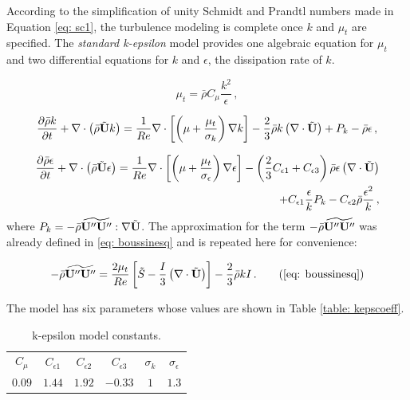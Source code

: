 According to the simplification of unity Schmidt and Prandtl numbers made in Equation \eqref{eq: sc1}, the turbulence modeling
is complete once $k$ and $\mu_t$ are specified. The \textit{standard k-epsilon}
model provides one algebraic equation for $\mu_t$ and two differential equations
for $k$ and $\epsilon$, the dissipation rate of $k$. 

\begin{equation}
 \mu_t = \bar{\rho} C_{\mu} \frac{k^2}{\epsilon} \, ,
\end{equation}

\begin{equation}
 \frac{\partial \bar{\rho}k}{\partial t} + \nabla \cdot \left( \bar{\rho}
\tilde{\mathbf{U}} k \right) = \frac{1}{Re}\nabla \cdot \left[ \left( \mu +
\frac{\mu_t}{\sigma_k} \right) \nabla k \right] -\frac{2}{3} \bar{\rho} k \left(
\nabla \cdot \tilde{\mathbf{U}} \right) + P_k -\bar{\rho} \epsilon \, ,
\end{equation}

\begin{equation}\begin{split}
 \frac{\partial \bar{\rho}\epsilon}{\partial t} + \nabla \cdot \left( \bar{\rho}
\tilde{\mathbf{U}} \epsilon \right) = \frac{1}{Re} \nabla \cdot \left[ \left( \mu +
\frac{\mu_t}{\sigma_{\epsilon}} \right) \nabla \epsilon \right]  - \left(
\frac{2}{3}C_{\epsilon1}+C_{\epsilon3}\right)\bar{\rho}\epsilon \left( \nabla
\cdot \tilde{\mathbf{U}}\right) \\
+ C_{\epsilon 1} \frac{\epsilon}{k} P_k - C_{\epsilon 2} \bar{\rho}
\frac{\epsilon^2}{k} \, ,
\end{split}\end{equation}
where $P_k = - \bar{\rho} \widetilde{\mathbf{U}'' \mathbf{U}''}: \nabla \tilde{\mathbf{U}}$.
The approximation for the term $- \bar{\rho} \widetilde{\mathbf{U}'' \mathbf{U}''}$ was
already defined in \eqref{eq: boussinesq} and is repeated here for convenience:

\begin{equation}
 - \bar{\rho}\widetilde{\bv{U}'' \bv{U}''} =  \frac{2 \mu_t}{Re} \left[
\tilde{S}-\frac{I}{3} \left( \nabla \cdot \tilde{\bv{U}} \right)  \right] -
\frac{2}{3}\bar{\rho}kI \, .
\tag{\ref{eq: boussinesq}}
\end{equation}

The model has six parameters whose values are shown in Table \ref{table:
kepscoeff}.
\begin{table}
\centering
 \begin{tabular}{cccccc}
  \hline
  $C_{\mu}$ & $C_{\epsilon 1}$ & $C_{\epsilon 2}$ & $C_{\epsilon 3}$  & $\sigma_k$ & $\sigma_{\epsilon}$\\
  $0.09$ & $1.44$ & $1.92$ & $-0.33$ & $1$ & $1.3$ \\ \hline
 \end{tabular}
\caption{k-epsilon model constants.}
\label{table: kepscoeff}
\end{table} 


